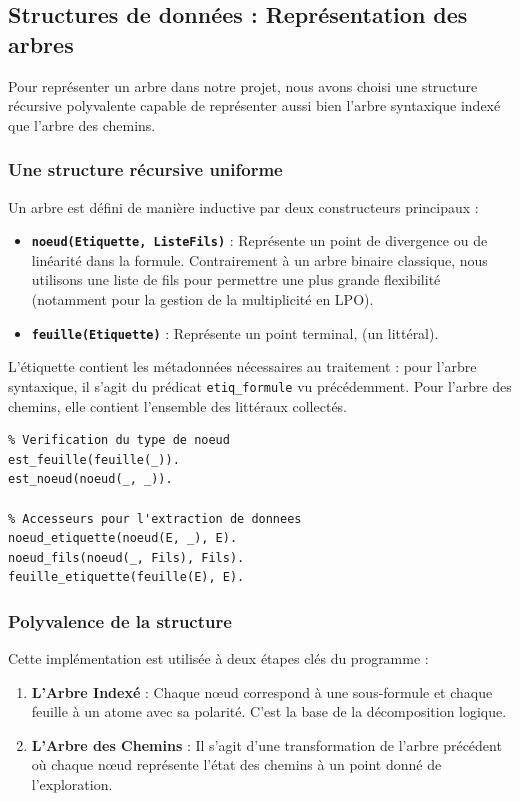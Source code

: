 \documentclass[12pt, a4paper]{article}
\begin{document}
\subsection{Structures de données : Représentation des arbres}

Pour représenter un arbre dans notre projet, nous avons choisi une structure récursive polyvalente capable de représenter aussi bien l'arbre syntaxique indexé que l'arbre des chemins.

\subsubsection{Une structure récursive uniforme}

Un arbre est défini de manière inductive par deux constructeurs principaux :
\begin{itemize}
    \item \textbf{\texttt{noeud(Etiquette, ListeFils)}} : Représente un point de divergence ou de linéarité dans la formule. Contrairement à un arbre binaire classique, nous utilisons une liste de fils pour permettre une plus grande flexibilité (notamment pour la gestion de la multiplicité en LPO).
    \item \textbf{\texttt{feuille(Etiquette)}} : Représente un point terminal, (un littéral).
\end{itemize}

L'étiquette contient les métadonnées nécessaires au traitement : pour l'arbre syntaxique, il s'agit du prédicat \texttt{etiq\_formule} vu précédemment. Pour l'arbre des chemins, elle contient l'ensemble des littéraux collectés.

\begin{lstlisting}
% Verification du type de noeud
est_feuille(feuille(_)).
est_noeud(noeud(_, _)).

% Accesseurs pour l'extraction de donnees
noeud_etiquette(noeud(E, _), E).
noeud_fils(noeud(_, Fils), Fils).
feuille_etiquette(feuille(E), E).
\end{lstlisting}

\subsubsection{Polyvalence de la structure}

Cette implémentation est utilisée à deux étapes clés du programme :
\begin{enumerate}
    \item \textbf{L'Arbre Indexé} : Chaque nœud correspond à une sous-formule et chaque feuille à un atome avec sa polarité. C'est la base de la décomposition logique.
    \item \textbf{L'Arbre des Chemins} : Il s'agit d'une transformation de l'arbre précédent où chaque nœud représente l'état des chemins à un point donné de l'exploration.
\end{enumerate}
\end{document}
